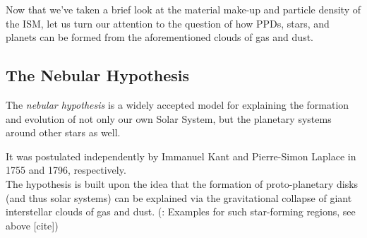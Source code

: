 
    


    Now that we've taken a brief look at the material make-up and particle density of the ISM, 
    let us turn our attention to the question of how PPDs, stars, and planets can be formed 
    from the aforementioned clouds of gas and dust.

\clearpage\subsection{The Nebular Hypothesis}

    The \textit{nebular hypothesis} is a widely accepted model for explaining the formation and 
    evolution of not only our own Solar System, but the planetary systems around other stars as 
    well. 

    It was postulated independently by Immanuel Kant        %
    and Pierre-Simon Laplace                                %
    in 1755 and 1796, respectively. \\                      %

    The hypothesis is built upon the idea that the formation of proto-planetary disks (and thus 
    solar systems) can be explained via the gravitational collapse of giant interstellar clouds 
    of gas and dust. (\todo: Examples for such star-forming regions, see above [cite]) \\

